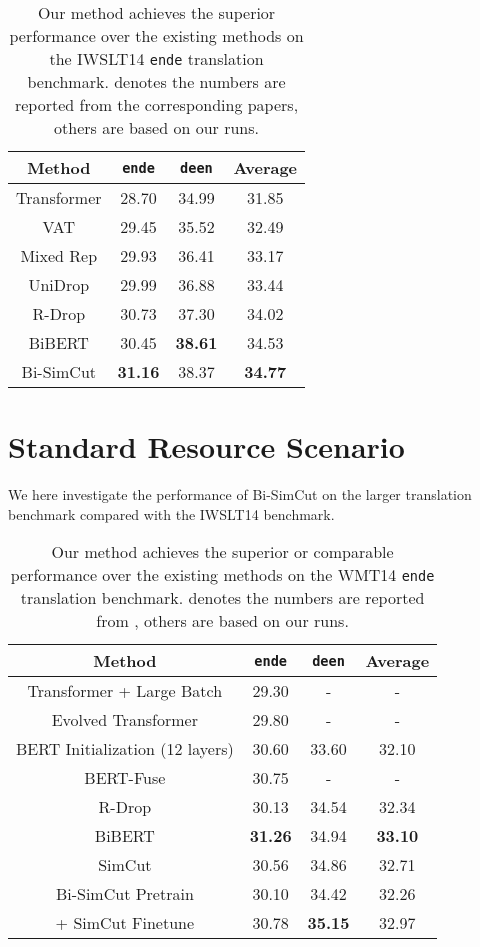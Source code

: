 \documentclass[11pt]{article}
\begin{document}
\begin{table}
\centering
\begin{tabular}{c|c|c|c}
\hline
Method & \texttt{en}\texttt{de} & \texttt{de}\texttt{en} & Average \\
\hline\hline
Transformer & 28.70 & 34.99 & 31.85 \\
VAT & 29.45 & 35.52 & 32.49 \\
Mixed Rep & 29.93 & 36.41 & 33.17 \\
UniDrop & 29.99 & 36.88 & 33.44\\
R-Drop & 30.73 & 37.30 & 34.02 \\
BiBERT & 30.45 & \bf 38.61 & 34.53 \\
\hline
Bi-SimCut & \bf 31.16 & 38.37 & \bf 34.77 \\
\end{tabular}
\caption{Our method achieves the superior performance over the existing methods on the IWSLT14 \texttt{en}\texttt{de} translation benchmark.  denotes the numbers are reported from the corresponding papers, others are based on our runs. \label{benchmark}}
\end{table}


\section{Standard Resource Scenario}\label{standard-resource}

We here investigate the performance of Bi-SimCut on the larger translation benchmark compared with the IWSLT14 benchmark.

\begin{table*}
\centering
\begin{tabular}{c|c|c|c}
\hline
Method & \texttt{en}\texttt{de} & \texttt{de}\texttt{en} & Average \\
\hline\hline
Transformer + Large Batch \cite{ott2018scaling} & 29.30 & - & - \\
Evolved Transformer \cite{so2019evolved} & 29.80 & - & - \\
BERT Initialization (12 layers) \cite{rothe2020leveraging} & 30.60 & 33.60 & 32.10 \\
BERT-Fuse \cite{zhu2020incorporating} & 30.75 & - & - \\
R-Drop \cite{liang2021r} & 30.13 & 34.54 & 32.34 \\
BiBERT \cite{xu-etal-2021-bert} & \bf 31.26 & 34.94 & \bf 33.10 \\
\hline
SimCut & 30.56 & 34.86 & 32.71 \\
Bi-SimCut Pretrain & 30.10 & 34.42 & 32.26 \\
+ SimCut Finetune & 30.78 & \bf 35.15 & 32.97 \\
\end{tabular}
\caption{Our method achieves the superior or comparable performance over the existing methods on the WMT14 \texttt{en}\texttt{de} translation benchmark.  denotes the numbers are reported from \citet{xu-etal-2021-bert}, others are based on our runs. \label{ende}}
\end{table*}
\end{document}
